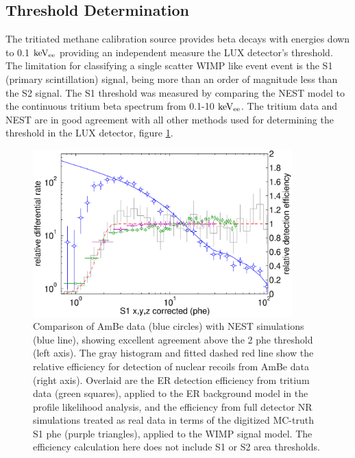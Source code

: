 

\subsection{Threshold Determination}

The tritiated methane calibration source provides beta decays with energies down to 0.1 $\rm keV_{ee}$ providing an independent measure the LUX detector's threshold. The limitation for classifying a single scatter WIMP like event event is the S1 (primary scintillation) signal, being more than an order of magnitude less than the S2 signal. The S1 threshold was measured by comparing the NEST model to the continuous tritium beta spectrum from 0.1-10 $\rm keV_{ee}$. The tritium data and NEST are in good agreement with all other methods used for determining the threshold in the LUX detector, figure \ref{fig:S1_Thresh}. 


\begin{figure}[h!]\centering
\includegraphics[width=100mm]{Triritium_S1_Threshold_2013_PRL.eps}
\caption{Comparison of AmBe data (blue circles) with NEST simulations (blue line), showing excellent agreement above the 2 phe threshold (left axis). The gray histogram and fitted dashed red line show the relative efficiency for detection of nuclear recoils from AmBe data (right axis). Overlaid are the ER detection efficiency from tritium data (green squares), applied to the ER background model in the profile likelihood analysis, and the efficiency from full detector NR simulations treated as real data in terms of the digitized MC-truth S1 phe (purple triangles), applied to the WIMP signal model. The efficiency calculation here does not include S1 or S2 area thresholds. }
\label{fig:S1_Thresh}
\end{figure}


